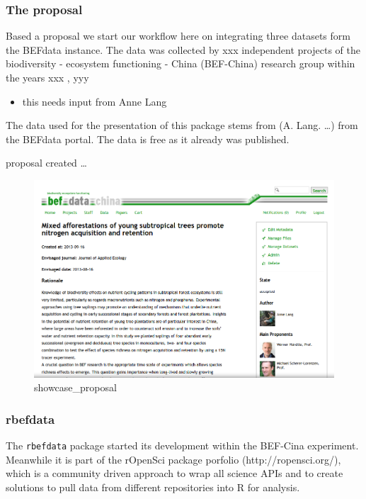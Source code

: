 \documentclass[]{article}
\makeatletter
\def\maxwidth{\ifdim\Gin@nat@width>\linewidth\linewidth
\else\Gin@nat@width\fi}
\let\Oldincludegraphics\includegraphics
\renewcommand{\includegraphics}[1]{\Oldincludegraphics[width=\maxwidth]{#1}}
\makeatother
\begin{document}
\subsubsection{The proposal}

Based a proposal we start our workflow here on integrating three
datasets form the BEFdata instance. The data was collected by xxx
independent projects of the biodiversity - ecosystem functioning - China
(BEF-China) research group within the years xxx , yyy

\begin{itemize}
\itemsep1pt\parskip0pt
\item
  this needs input from Anne Lang
\end{itemize}

The data used for the presentation of this package stems from (A. Lang.
\ldots{}) from the BEFdata portal. The data is free as it already was
published.

proposal created \ldots{}

\begin{figure}[htbp]
\centering
\includegraphics{./figure/static/showcase_proposal.png}
\caption{showcase\_proposal}
\end{figure}

\subsubsection{rbefdata}

The \texttt{rbefdata} package started its development within the
BEF-Cina experiment. Meanwhile it is part of the rOpenSci package
porfolio (http://ropensci.org/), which is a community driven approach to
wrap all science APIs and to create solutions to pull data from
different repositories into R for analysis.
\end{document}

